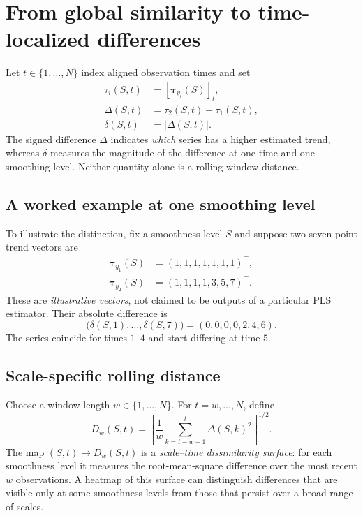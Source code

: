 \documentclass[10pt,letterpaper]{article}
\begin{document}
\section{From global similarity to time-localized differences}
\label{sec:rolling}
Let $t\in\{1,\ldots,N\}$ index aligned observation times and set
\begin{equation}\label{eq:components}
\begin{aligned}
\tau_i(S,t)&=[\bm\tau_{y_i}(S)]_t,\\
\Delta(S,t)&=\tau_2(S,t)-\tau_1(S,t),\\
\delta(S,t)&=|\Delta(S,t)|.
\end{aligned}
\end{equation}
The signed difference $\Delta$ indicates \emph{which} series has a
higher estimated trend, whereas $\delta$ measures the magnitude of the
difference at one time and one smoothing level. Neither quantity alone
is a rolling-window distance.

\subsection{A worked example at one smoothing level}
To illustrate the distinction, fix a smoothness level $S$ and suppose
two seven-point trend vectors are
\begin{equation}\label{eq:example}
\begin{aligned}
\bm\tau_{y_1}(S)&=(1,1,1,1,1,1,1)^\top,\\
\bm\tau_{y_2}(S)&=(1,1,1,1,3,5,7)^\top.
\end{aligned}
\end{equation}
These are \emph{illustrative vectors}, not claimed to be outputs of a
particular PLS estimator. Their absolute difference is
\begin{equation}
  \bigl(\delta(S,1),\ldots,\delta(S,7)\bigr)
  =(0,0,0,0,2,4,6).
\end{equation}
The series coincide for times $1$--$4$ and start differing at time $5$.

\subsection{Scale-specific rolling distance}
Choose a window length $w\in\{1,\ldots,N\}$. For $t=w,\ldots,N$,
define
\begin{equation}\label{eq:scale_time}
  D_w(S,t)
  =\left[\frac1w\sum_{k=t-w+1}^{t}\Delta(S,k)^2\right]^{1/2}.
\end{equation}
The map $(S,t)\mapsto D_w(S,t)$ is a \emph{scale--time dissimilarity
surface}: for each smoothness level it measures the root-mean-square
difference over the most recent $w$ observations. A heatmap of this
surface can distinguish differences that are visible only at some
smoothness levels from those that persist over a broad range of scales.
\end{document}
